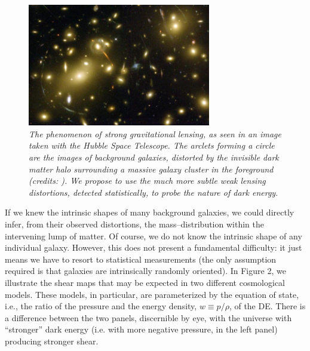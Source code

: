 \documentclass[10pt, preprint]{aastex}
\begin{document}
\begin{figure}[t] \label{fig:a2212} \begin{center}
\includegraphics[width=8cm]{a2218c_hst.jpg}
\caption{\it The
  phenomenon of strong gravitational lensing, as seen in an image
  taken with the {\it Hubble Space Telescope}.  The arclets forming a
  circle are the images of background galaxies, distorted by the
  invisible dark matter halo surrounding a massive galaxy cluster in
  the foreground (credits: \citealt{Kneib+1996}).  We propose to use
  the much more subtle weak lensing distortions, detected
  statistically, to probe the nature of dark
  energy.}  \end{center} \vspace{-2\baselineskip}\end{figure}

If we knew the intrinsic shapes of many background galaxies, we could
directly infer, from their observed distortions, the
mass--distribution within the intervening lump of matter.  Of course,
we do not know the intrinsic shape of any individual galaxy.  However,
this does not present a fundamental difficulty: it just means we have
to resort to statistical measurements (the only assumption required is
that galaxies are intrinsically randomly oriented).  In Figure 2, we
illustrate the shear maps that may be expected in two different
cosmological models. These models, in particular, are parameterized by
the equation of state, i.e., the ratio of the pressure and the energy
density, $w\equiv p/\rho$, of the DE. There is a difference between
the two panels, discernible by eye, with the universe with
``stronger'' dark energy (i.e. with more negative pressure, in the
left panel) producing stronger shear.
\end{document}
